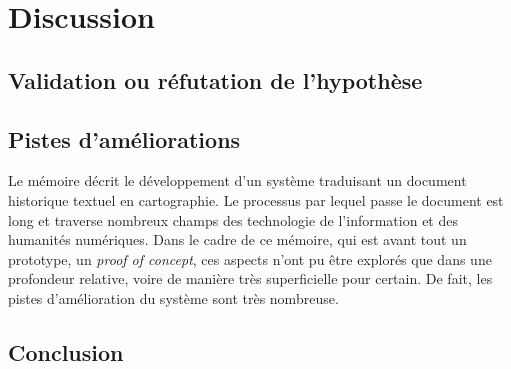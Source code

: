 \chapter{Discussion}
\section{Validation ou réfutation de l'hypothèse}
\section{Pistes d'améliorations}
Le mémoire décrit le développement d'un système traduisant un document historique textuel en cartographie. Le processus par lequel passe le document est long  et traverse nombreux champs des technologie de l'information et des humanités numériques. Dans le cadre de ce  mémoire, qui est avant tout un prototype, un \textit{proof of concept}, ces aspects n'ont pu être explorés que dans une profondeur relative, voire de manière très superficielle pour certain. De fait, les pistes d'amélioration du système sont très nombreuse.
\section{Conclusion}

